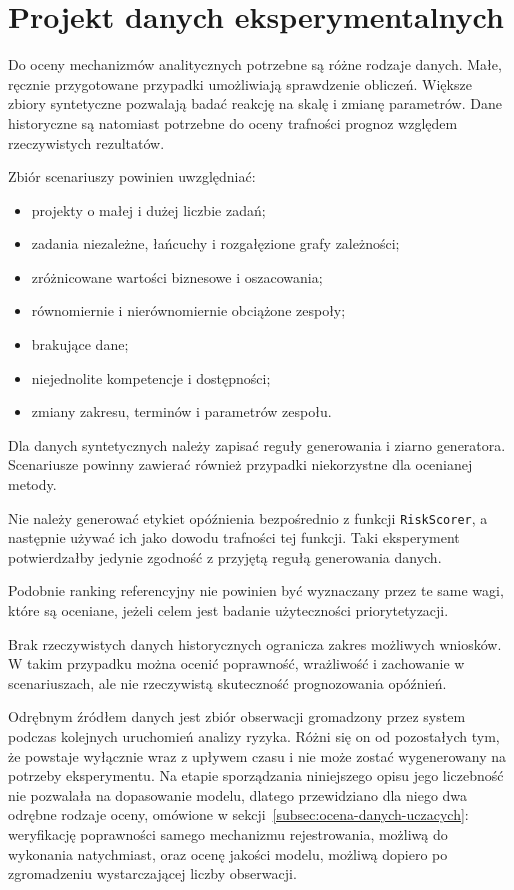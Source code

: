 \section{Projekt danych eksperymentalnych}

Do oceny mechanizmów analitycznych potrzebne są różne rodzaje danych. Małe, ręcznie przygotowane przypadki umożliwiają sprawdzenie obliczeń. Większe zbiory syntetyczne pozwalają badać reakcję na skalę i zmianę parametrów. Dane historyczne są natomiast potrzebne do oceny trafności prognoz względem rzeczywistych rezultatów.

Zbiór scenariuszy powinien uwzględniać:

\begin{itemize}
    \item projekty o małej i dużej liczbie zadań;
    \item zadania niezależne, łańcuchy i rozgałęzione grafy zależności;
    \item zróżnicowane wartości biznesowe i oszacowania;
    \item równomiernie i nierównomiernie obciążone zespoły;
    \item brakujące dane;
    \item niejednolite kompetencje i dostępności;
    \item zmiany zakresu, terminów i parametrów zespołu.
\end{itemize}

Dla danych syntetycznych należy zapisać reguły generowania i ziarno generatora. Scenariusze powinny zawierać również przypadki niekorzystne dla ocenianej metody.

Nie należy generować etykiet opóźnienia bezpośrednio z funkcji \texttt{RiskScorer}, a następnie używać ich jako dowodu trafności tej funkcji. Taki eksperyment potwierdzałby jedynie zgodność z przyjętą regułą generowania danych.

Podobnie ranking referencyjny nie powinien być wyznaczany przez te same wagi, które są oceniane, jeżeli celem jest badanie użyteczności priorytetyzacji.

Brak rzeczywistych danych historycznych ogranicza zakres możliwych wniosków. W takim przypadku można ocenić poprawność, wrażliwość i zachowanie w scenariuszach, ale nie rzeczywistą skuteczność prognozowania opóźnień.

Odrębnym źródłem danych jest zbiór obserwacji gromadzony przez system podczas kolejnych uruchomień analizy ryzyka. Różni się on od pozostałych tym, że powstaje wyłącznie wraz z upływem czasu i nie może zostać wygenerowany na potrzeby eksperymentu. Na etapie sporządzania niniejszego opisu jego liczebność nie pozwalała na dopasowanie modelu, dlatego przewidziano dla niego dwa odrębne rodzaje oceny, omówione w sekcji~\ref{subsec:ocena-danych-uczacych}: weryfikację poprawności samego mechanizmu rejestrowania, możliwą do wykonania natychmiast, oraz ocenę jakości modelu, możliwą dopiero po zgromadzeniu wystarczającej liczby obserwacji.

